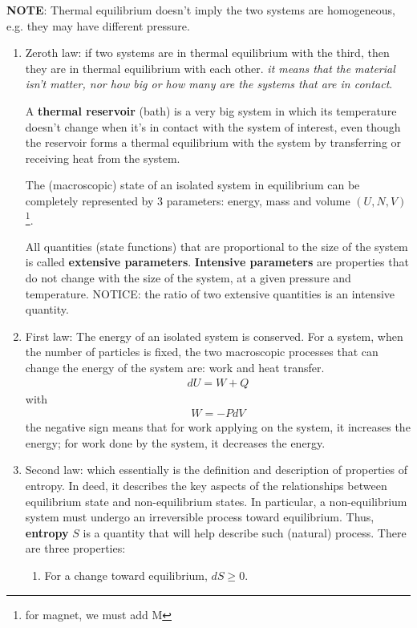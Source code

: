 {\bf NOTE}: Thermal equilibrium doesn't imply the two systems are
homogeneous, e.g. they may have different pressure.
\begin{enumerate}
\item Zeroth law: if two systems are in thermal equilibrium with the
  third, then they are in thermal equilibrium with each other. {\it it
    means that the material isn't matter, nor how big or how many are
    the systems that are in contact}.

  A {\bf thermal reservoir} (bath) is a very big system in which its
  temperature doesn't change when it's in contact with the system of
  interest, even though the reservoir forms a thermal equilibrium with
  the system by transferring or receiving heat from the system.

The (macroscopic) state of an isolated system in equilibrium can be
completely represented by 3 parameters: energy, mass and volume $(U,
N, V)$\footnote{for magnet, we must add M}.

All quantities (state functions) that are proportional to the size of
the system is called {\bf extensive parameters}. {\bf Intensive
  parameters} are properties that do not change with the size of the
system, at a given pressure and temperature. NOTICE: the ratio of two
extensive quantities is an intensive quantity.  

\item First law: The energy of an isolated system is conserved. For a
  system, when the number of particles is fixed, the two macroscopic
  processes that can change the energy of the system are: work and
  heat transfer.
  \begin{eqnarray*}
    dU = W + Q
  \end{eqnarray*}
with 
\begin{eqnarray*}
  W = -PdV
\end{eqnarray*} 
the negative sign means that for work applying on the system, it
increases the energy; for work done by the system, it decreases the
energy. 

\item Second law: which essentially is the definition and description
  of properties of entropy. In deed, it describes the key aspects of
  the relationships between equilibrium state and non-equilibrium
  states. In particular, a non-equilibrium system must undergo an
  irreversible process toward equilibrium. Thus, {\bf entropy} $S$ is
  a quantity that will help describe such (natural) process. There are
  three properties:
  \begin{enumerate}
  \item For a change toward equilibrium, $dS \ge 0$.


\end{enumerate}
\end{enumerate}
